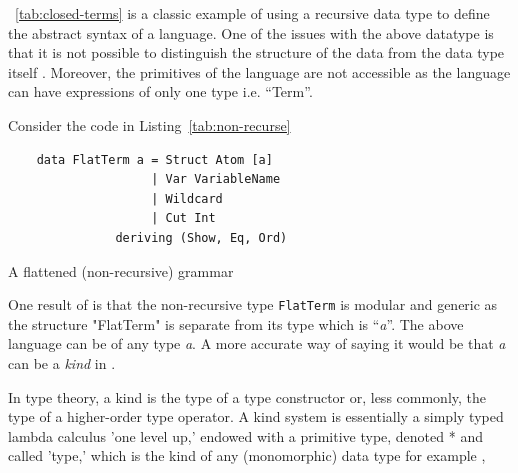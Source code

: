 \documentclass[thesis-solanki.tex]{subfiles}
\begin{document}
~\ref{tab:closed-terms} is a classic example of using a recursive data type to define the
abstract syntax of a language.
One of the issues with the above datatype is that it is not possible to distinguish the structure of the data from
the data type itself \cite{sheard2004two}.
Moreover, the primitives of the language
are not accessible as the language can have expressions of only one
type i.e. ``Term''.

Consider the code in Listing~\ref{tab:non-recurse}
\begin{code-list}
  \begin{verbatim}
    data FlatTerm a = Struct Atom [a]
                    | Var VariableName
                    | Wildcard
                    | Cut Int
               deriving (Show, Eq, Ord)
  \end{verbatim}
  \caption{A flattened (non-recursive) grammar}
  \label{tab:non-recurse}
\end{code-list}

One result of 
  is that the non-recursive type
\texttt{FlatTerm} is modular and generic as the structure
"FlatTerm"
is separate
from its
type which is ``\textit{a}''.
The above language can be of any type \textit{a}.
A more accurate way of saying it would be that \textit{a} can be a \textit{kind} in
.

In type theory, a kind is the type of a type constructor or, less commonly, the type of a higher-order type operator. A kind system is
essentially a simply typed lambda calculus 'one level up,' endowed with a primitive type, denoted * and called 'type,' which is the kind of
any (monomorphic) data type for example \cite{website:kindhaskellwiki},
\end{document}
